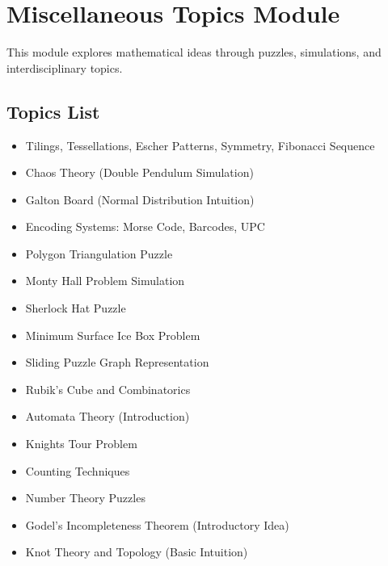 \documentclass[12pt]{article}
\begin{document}
\section{Miscellaneous Topics Module}

This module explores mathematical ideas through puzzles, simulations, and interdisciplinary topics.

\subsection*{Topics List}

\begin{itemize}
    \item Tilings, Tessellations, Escher Patterns, Symmetry, Fibonacci Sequence
    \item Chaos Theory (Double Pendulum Simulation)
    \item Galton Board (Normal Distribution Intuition)
    \item Encoding Systems: Morse Code, Barcodes, UPC
    \item Polygon Triangulation Puzzle
    \item Monty Hall Problem Simulation
    \item Sherlock Hat Puzzle
    \item Minimum Surface Ice Box Problem
    \item Sliding Puzzle Graph Representation
    \item Rubik's Cube and Combinatorics
    \item Automata Theory (Introduction)
    \item Knights Tour Problem
    \item Counting Techniques
    \item Number Theory Puzzles
    \item Godel's Incompleteness Theorem (Introductory Idea)
    \item Knot Theory and Topology (Basic Intuition)
\end{itemize}


\end{document}
